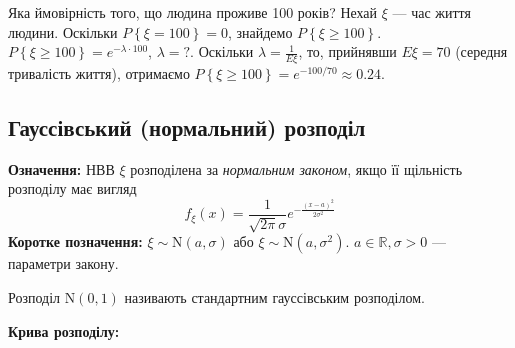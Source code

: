 \begin{example}
    Яка ймовірність того, що людина проживе 100 років? Нехай $\xi$ --- час життя людини.
    Оскільки $P\left\{\xi = 100\right\} = 0$, знайдемо $P\left\{ \xi \geq 100\right\}$.
    $P\left\{ \xi \geq 100\right\} = e^{-\lambda \cdot 100}$, $\lambda = \text{?}$.
    Оскільки $\lambda = \frac{1}{E\xi}$, то, прийнявши $E\xi = 70$ (середня тривалість життя),
    отримаємо $P\left\{ \xi \geq 100\right\} = e^{-100/70} \approx 0.24$.
\end{example}

\subsection{Гауссівський (нормальний) розподіл}
\noindent\textbf{Означення:}
    НВВ $\xi$ розподілена за \emph{нормальним законом}, 
    якщо її щільність розподілу має вигляд 
    \begin{equation}
        f_\xi(x) = \frac{1}{\sqrt{2\pi}\sigma} e^{-\frac{(x-a)^2}{2\sigma^2}}
    \end{equation}
\textbf{Коротке позначення:} $\xi \sim \mathrm{N}(a, \sigma)$ або 
    $\xi \sim \mathrm{N}(a, \sigma^2)$.
    $a \in \mathbb{R}, \sigma > 0$ --- параметри закону.

    Розподіл $\mathrm{N}(0, 1)$ називають стандартним гауссівським розподілом.

\noindent \textbf{Крива розподілу:}


